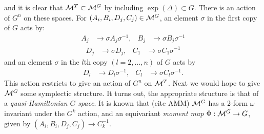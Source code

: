 	and it is clear that $\mathcal{M}^T \subset \mathcal{M}^G$ by including $\exp(\Delta)\subset G$. There is an action of $G^n$ on these spaces. For $(A_i,B_i,D_j,C_j)\in \mathcal{M}^G$, an element $\sigma$ in the first copy of $G$ acts by:
	\begin{align*}
		A_j &\to \sigma A_j \sigma^{-1},& 	B_j&\to \sigma B_j\sigma^{-1}
	\end{align*}
	\begin{align*}
		D_j&\to \sigma D_j, & C_1 &\to \sigma C_1\sigma^{-1}
	\end{align*}
	and an element $\sigma$ in the $l$th copy $(l=2,...,n)$ of $G$ acts by
	\begin{align}
	\label{e:impl-action}
	D_l&\to D_l\sigma^{-1}, & C_l &\to \sigma C_l\sigma^{-1}.
	\end{align}
	This action restricts to give an action of $G^n$ on $\mathcal{M}^T$. Next we would hope to give $\mathcal{M}^G$ some symplectic structure. It turns out, the appropriate structure is that of a \textit{quasi-Hamiltonian} $G$ \textit{space}. It is known that (cite AMM) $\mathcal{M}^G$ has a 2-form $\omega$ invariant under the $G^k$ action, and an equivariant \textit{moment map} $\Phi:\mathcal{M}^G\to G$, given by $(A_i,B_i,D_j,C_j)\to C_k^{-1}$. 
	
